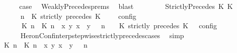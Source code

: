 \begin{isabellebody}
\isanewline
\ \ \ \ \ \ \isamarkupfalse%
\ \isamarkupfalse%
\ {\isacharquery}case\ \isamarkupfalse%
\ WeaklyPrecedes{\isachardot}prems{\isacharparenleft}{}{\isacharparenright}\ \isamarkupfalse%
\ blast\isanewline
\ \ \isamarkupfalse%
\isanewline
\ \ \ \ \isamarkupfalse%
\ {\isacharparenleft}StrictlyPrecedes\ K\ K\isanewline
\ \ \ \ \ \ \isamarkupfalse%
\ {\isacartoucheopen}{\isasymlbrakk}\ {\isasymGamma}{\isacharcomma}\ n\ {\isasymturnstile}\ {\isacharparenleft}{\isacharparenleft}K\ strictly\ precedes\ K\ {\isacharhash}\ {\isasymPsi}{\isacharparenright}\ {\isasymtriangleright}\ {\isasymPhi}\ {\isasymrbrakk}\isactrlsub c\isactrlsub o\isactrlsub n\isactrlsub f\isactrlsub i\isactrlsub g\ {\isacharequal}\isanewline
\ \ \ \ \ \ \ \ {\isasymlbrakk}\ {\isacharparenleft}{\isacharparenleft}{\isasymlceil}{\isacharhash}\isactrlsup {\isasymle}\ K\ n{\isacharcomma}\ {\isacharhash}\isactrlsup {\isacharless}\ K\ n{\isasymrceil}\ {\isasymin}\ {\isacharparenleft}{\isasymlambda}{\isacharparenleft}x{\isacharcomma}\ y{\isacharparenright}{\isachardot}\ x\ {\isasymle}\ y{\isacharparenright}{\isacharparenright}\ {\isacharhash}\ {\isasymGamma}{\isacharparenright}{\isacharcomma}\ n\ {\isasymturnstile}\ {\isasymPsi}\ {\isasymtriangleright}\ {\isacharparenleft}{\isacharparenleft}K\ strictly\ precedes\ K\ {\isacharhash}\ {\isasymPhi}{\isacharparenright}\ {\isasymrbrakk}\isactrlsub c\isactrlsub o\isactrlsub n\isactrlsub f\isactrlsub i\isactrlsub g{\isacartoucheclose}\isanewline
\ \ \ \ \ \ \ \ \isamarkupfalse%
\ HeronConf{\isacharunderscore}interp{\isacharunderscore}stepwise{\isacharunderscore}strictly{\isacharunderscore}precedes{\isacharunderscore}cases\ \isamarkupfalse%
\ simp\isanewline
\ \ \ \ \ \ \isamarkupfalse%
\ \isamarkupfalse%
\ {\isacartoucheopen}{\isasymrho}\ {\isasymin}\ {\isasymlbrakk}\ {\isacharparenleft}{\isacharparenleft}{\isasymlceil}{\isacharhash}\isactrlsup {\isasymle}\ K\ n{\isacharcomma}\ {\isacharhash}\isactrlsup {\isacharless}\ K\ n{\isasymrceil}\ {\isasymin}\ {\isacharparenleft}{\isasymlambda}{\isacharparenleft}x{\isacharcomma}\ y{\isacharparenright}{\isachardot}\ x\ {\isasymle}\ y{\isacharparenright}{\isacharparenright}\ {\isacharhash}\ {\isasymGamma}{\isacharparenright}{\isacharcomma}\ n\isanewline

\end{isabellebody}
